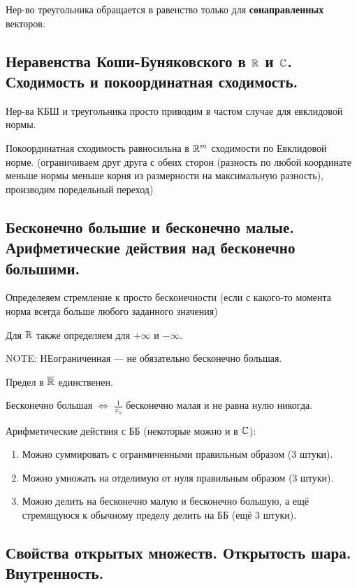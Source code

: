 \documentclass[12pt, a4paper]{article}
\begin{document}
Нер-во треугольника обращается в равенство только для \textbf{сонаправленных} векторов.


\subsection{Неравенства Коши-Буняковского в ${\mathbb{R}}$ и ${\mathbb{C}}$. Сходимость и покоординатная сходимость.}

Нер-ва КБШ и треугольника просто приводим в частом случае для евклидовой нормы.

Покоординатная сходимость равносильна в ${\mathbb{R}}^m$ сходимости по Евклидовой норме.
(ограничиваем друг друга с обеих сторон (разность по любой координате меньше нормы меньше корня из размерности на максимальную разность), производим поредельный переход)


\subsection{Бесконечно большие и бесконечно малые. Арифметические действия над бесконечно большими.}

Определеяем стремление к просто бесконечности (если с какого-то момента норма всегда больше любого заданного значения)

Для ${\mathbb{R}}$ также определяем для $+\infty$ и $-\infty$.

NOTE: НЕограниченная — не обязательно бесконечно большая.

Предел в $\overline{{\mathbb{R}}}$ единственен.

Бесконечно большая $\Leftrightarrow$ $\frac{1}{x_n}$ бесконечно малая и не равна нулю никогда.

Арифметические действия с ББ (некоторые можно и в ${\mathbb{C}}$):

\begin{enumerate}
    \item Можно суммировать с огранмиченными правильным образом (3 штуки).
    \item Можно умножать на отделимую от нуля правильным образом (3 штуки).
    \item Можно делить на бесконечно малую и бесконечно большую, а ещё стремящуюся к обычному пределу делить на ББ (ещё 3 штуки).
\end{enumerate}

\subsection{Свойства открытых множеств. Открытость шара. Внутренность.}
\end{document}
